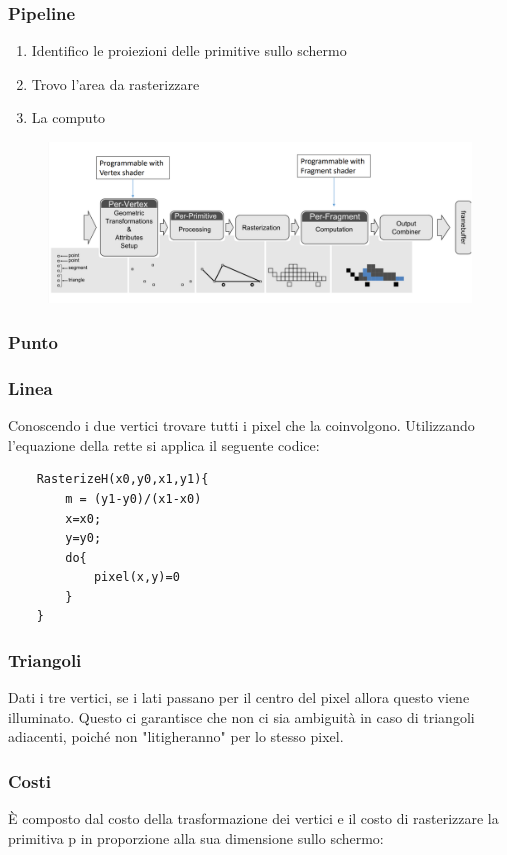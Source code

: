 \subsubsection{Pipeline}
\begin{enumerate}
	\item Identifico le proiezioni delle primitive sullo schermo
	\item Trovo l'area da rasterizzare
	\item La computo
\end{enumerate}
\begin{figure}[h]
	\includegraphics[scale=0.25]{rasterization_pipeline.png}
	\centering
\end{figure}
\subsubsection{Punto}
\subsubsection{Linea}
Conoscendo i due vertici trovare tutti i pixel che la coinvolgono. Utilizzando l'equazione della rette si applica il seguente codice:
\begin{lstlisting}
	RasterizeH(x0,y0,x1,y1){
		m = (y1-y0)/(x1-x0)
		x=x0;
		y=y0;
		do{
			pixel(x,y)=0
		}
	}
\end{lstlisting}
\subsubsection{Triangoli}
Dati i tre vertici, se i lati passano per il centro del pixel allora questo viene illuminato. Questo ci garantisce che non ci sia ambiguità in caso di triangoli adiacenti, poiché non "litigheranno" per lo stesso pixel.
\subsubsection{Costi}
È composto dal costo della trasformazione dei vertici e il costo di rasterizzare la primitiva p in proporzione alla sua dimensione sullo schermo:
\begin{equation}
\end{equation}
